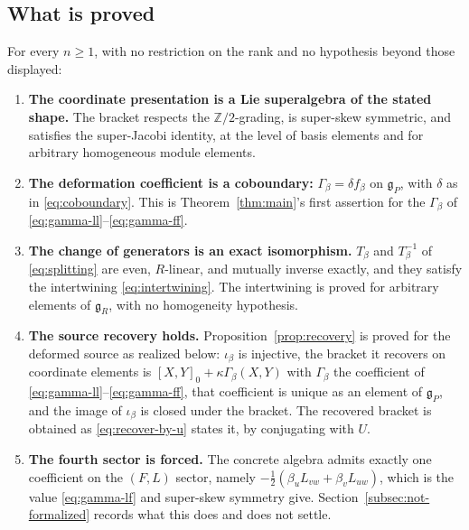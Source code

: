 \documentclass[11pt]{article}
\numberwithin{equation}{section}
\theoremstyle{remark}
\begin{document}
\subsection{What is proved}\label{subsec:formal-proved}

For every $n\geq1$, with no restriction on the rank and no hypothesis beyond
those displayed:

\begin{enumerate}
\item\label{item:P1} \textbf{The coordinate presentation is a Lie superalgebra of
the stated shape.} The bracket respects the $\mathbb Z/2$-grading, is
super-skew symmetric, and satisfies the super-Jacobi identity, at the level of
basis elements and for arbitrary homogeneous module elements.

\item\label{item:P2} \textbf{The deformation coefficient is a coboundary:}
$\Gamma_\beta=\delta f_\beta$ on $\mathfrak g_P$, with $\delta$ as in
\eqref{eq:coboundary}. This is Theorem~\ref{thm:main}'s first assertion for the
$\Gamma_\beta$ of \eqref{eq:gamma-ll}--\eqref{eq:gamma-ff}.

\item\label{item:P3} \textbf{The change of generators is an exact isomorphism.}
$T_\beta$ and $T_\beta^{-1}$ of \eqref{eq:splitting} are even, $R$-linear,
and mutually inverse exactly, and they satisfy the intertwining
\eqref{eq:intertwining}. The intertwining is
proved for arbitrary elements of $\mathfrak g_R$, with no homogeneity
hypothesis.

\item\label{item:P4} \textbf{The source recovery holds.}
Proposition~\ref{prop:recovery} is proved for the deformed source as realized
below: $\iota_\beta$ is injective, the bracket it recovers on coordinate
elements is $[X,Y]_0+\kappa\Gamma_\beta(X,Y)$ with $\Gamma_\beta$ the
coefficient of \eqref{eq:gamma-ll}--\eqref{eq:gamma-ff}, that coefficient is
unique as an element of $\mathfrak g_P$, and the image of $\iota_\beta$ is
closed under the bracket. The recovered bracket is obtained as
\eqref{eq:recover-by-u} states it, by conjugating with $U$.

\item\label{item:P5} \textbf{The fourth sector is forced.} The
concrete algebra admits exactly one coefficient on the $(F,L)$ sector, namely
$-\tfrac{1}{2}(\beta_uL_{vw}+\beta_vL_{uw})$, which is the value
\eqref{eq:gamma-lf} and super-skew symmetry give. Section~\ref{subsec:not-formalized}
records what this does and does not settle.
\end{enumerate}
\end{document}
